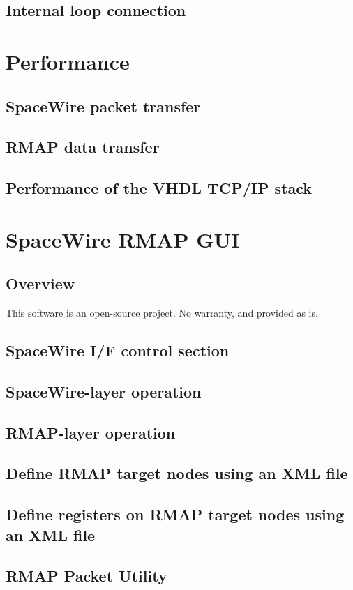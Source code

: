 \documentclass[a4paper,10pt]{article}
\begin{document}
\subsection{Internal loop connection}

\section{Performance}
\subsection{SpaceWire packet transfer}
\subsection{RMAP data transfer}
\subsection{Performance of the VHDL TCP/IP stack}

\section{SpaceWire RMAP GUI}
\subsection{Overview}
This software is an open-source project.
No warranty, and provided as is.
\subsection{SpaceWire I/F control section}
\subsection{SpaceWire-layer operation}
\subsection{RMAP-layer operation}
\subsection{Define RMAP target nodes using an XML file}
\subsection{Define registers on RMAP target nodes using an XML file}
\subsection{RMAP Packet Utility}
\end{document}
